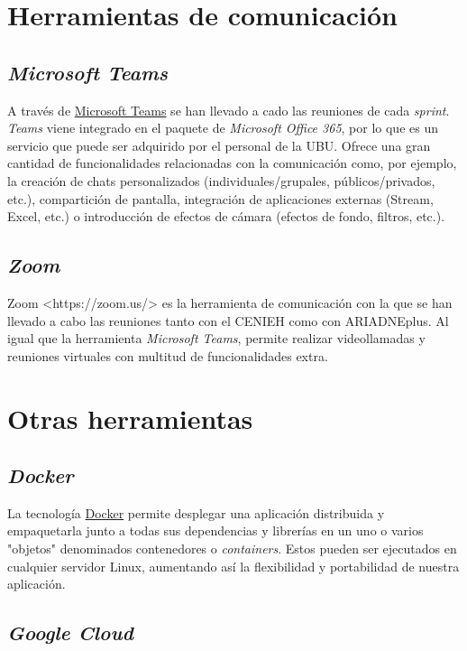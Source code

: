 \section{Herramientas de comunicación}

\subsection{\emph{Microsoft Teams}}

A través de
\href{https://www.microsoft.com/es-es/education/products/teams}{Microsoft
Teams} se han llevado a cado las reuniones de cada \emph{sprint}.
\emph{Teams} viene integrado en el paquete de \emph{Microsoft Office
365}, por lo que es un servicio que puede ser adquirido por el personal
de la UBU. Ofrece una gran cantidad de funcionalidades relacionadas con
la comunicación como, por ejemplo, la creación de chats personalizados
(individuales/grupales, públicos/privados, etc.), compartición de
pantalla, integración de aplicaciones externas (Stream, Excel, etc.) o
introducción de efectos de cámara (efectos de fondo, filtros, etc.).

\subsection{\emph{Zoom}}

{Zoom \textless https://zoom.us/\textgreater{}} es la herramienta de
comunicación con la que se han llevado a cabo las reuniones tanto con el
CENIEH como con ARIADNEplus. Al igual que la herramienta \emph{Microsoft
Teams}, permite realizar videollamadas y reuniones virtuales con
multitud de funcionalidades extra.

\section{Otras herramientas}

\subsection{\emph{Docker}}

La tecnología \href{https://www.docker.com/}{Docker} permite desplegar
una aplicación distribuida y empaquetarla junto a todas sus dependencias
y librerías en un uno o varios "objetos" denominados contenedores o
\emph{containers}. Estos pueden ser ejecutados en cualquier servidor
Linux, aumentando así la flexibilidad y portabilidad de nuestra
aplicación.

\subsection{\emph{Google Cloud}}

